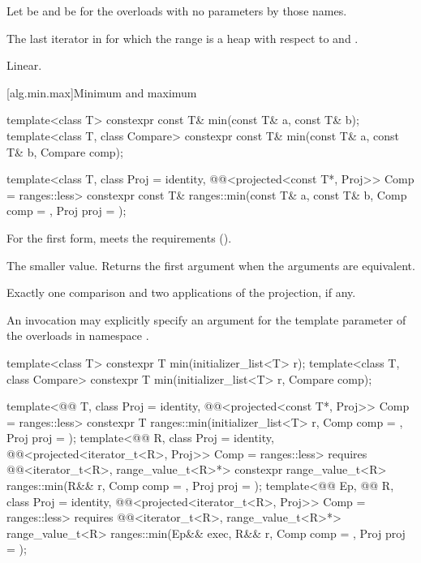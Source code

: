 \begin{itemdescr}
\pnum
Let  be 
and  be 
for the overloads with no parameters by those names.

\pnum
\returns
The last iterator  in 
for which the range 
is a heap with respect to  and .

\pnum
\complexity
Linear.
\end{itemdescr}


[alg.min.max]{Minimum and maximum}

%
\begin{itemdecl}
template<class T>
  constexpr const T& min(const T& a, const T& b);
template<class T, class Compare>
  constexpr const T& min(const T& a, const T& b, Compare comp);

template<class T, class Proj = identity,
         @@<projected<const T*, Proj>> Comp = ranges::less>
  constexpr const T& ranges::min(const T& a, const T& b, Comp comp = {}, Proj proj = {});
\end{itemdecl}

\begin{itemdescr}
\pnum
\expects
For the first form,  meets the
 requirements ().

\pnum
\returns
The smaller value.
Returns the first argument when the arguments are equivalent.

\pnum
\complexity
Exactly one comparison and two applications of the projection, if any.

\pnum
\remarks
An invocation may explicitly specify
an argument for the template parameter 
of the overloads in namespace .
\end{itemdescr}

%
\begin{itemdecl}
template<class T>
  constexpr T min(initializer_list<T> r);
template<class T, class Compare>
  constexpr T min(initializer_list<T> r, Compare comp);

template<@@ T, class Proj = identity,
         @@<projected<const T*, Proj>> Comp = ranges::less>
  constexpr T ranges::min(initializer_list<T> r, Comp comp = {}, Proj proj = {});
template<@@ R, class Proj = identity,
         @@<projected<iterator_t<R>, Proj>> Comp = ranges::less>
  requires @@<iterator_t<R>, range_value_t<R>*>
  constexpr range_value_t<R>
    ranges::min(R&& r, Comp comp = {}, Proj proj = {});
template<@@ Ep, @@ R, class Proj = identity,
         @@<projected<iterator_t<R>, Proj>> Comp = ranges::less>
  requires @@<iterator_t<R>, range_value_t<R>*>
  range_value_t<R>
    ranges::min(Ep&& exec, R&& r, Comp comp = {}, Proj proj = {});
\end{itemdecl}

